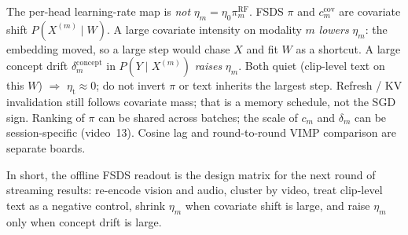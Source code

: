 The per-head learning-rate map is \emph{not} $\eta_m=\eta_0\pi_m^{\mathrm{RF}}$.
FSDS $\pi$ and $c_m^{\mathrm{cov}}$ are covariate shift $P(X^{(m)}\mid W)$.
A large covariate intensity on modality $m$ \emph{lowers} $\eta_m$: the embedding moved, so a large step would chase $X$ and fit $W$ as a shortcut.
A large concept drift $\delta_m^{\mathrm{concept}}$ in $P(Y\mid X^{(m)})$ \emph{raises} $\eta_m$.
Both quiet (clip-level text on this $W$) $\Rightarrow$ $\eta_{\mathrm{t}}\approx 0$; do not invert $\pi$ or text inherits the largest step.
Refresh / KV invalidation still follows covariate mass; that is a memory schedule, not the SGD sign.
Ranking of $\pi$ can be shared across batches; the scale of $c_m$ and $\delta_m$ can be session-specific (video~13).
Cosine lag and round-to-round VIMP comparison are separate boards.

In short, the offline FSDS readout is the design matrix for the next round of streaming results: re-encode vision and audio, cluster by video, treat clip-level text as a negative control, shrink $\eta_m$ when covariate shift is large, and raise $\eta_m$ only when concept drift is large.
